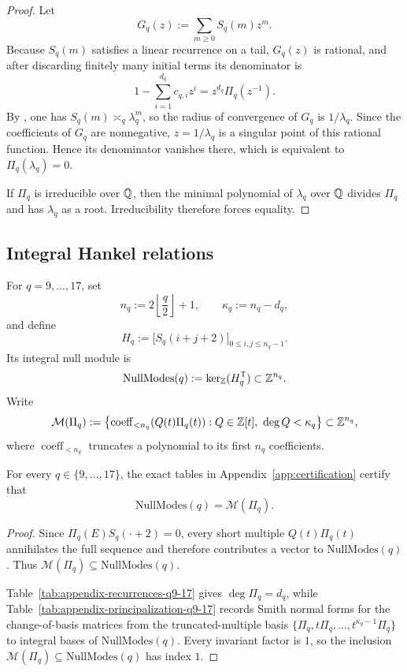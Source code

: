 \begin{proof}
Let
\[
  G_q(z):=\sum_{m\ge 0} S_q(m)z^m.
\]
Because \(S_q(m)\) satisfies a linear recurrence on a tail, \(G_q(z)\) is
rational, and after discarding finitely many initial terms its denominator is
\[
  1-\sum_{i=1}^{d_q} c_{q,i} z^i
  =
  z^{d_q}\Pi_q(z^{-1}).
\]
By , one has \(S_q(m)\asymp_q \lambda_q^m\), so the
radius of convergence of \(G_q\) is \(1/\lambda_q\).  Since the coefficients of
\(G_q\) are nonnegative, \(z=1/\lambda_q\) is a singular point of this rational
function.  Hence its denominator vanishes there, which is equivalent to
\(\Pi_q(\lambda_q)=0\).

If \(\Pi_q\) is irreducible over \(\mathbb{Q}\), then the minimal polynomial of
\(\lambda_q\) over \(\mathbb{Q}\) divides \(\Pi_q\) and has \(\lambda_q\) as a root.
Irreducibility therefore forces equality.
\end{proof}

\subsection{Integral Hankel relations}

\begin{definition}
\label{def:hankel-null-modes}
For \(q=9,\dots,17\), set
\[
  n_q:=2\left\lfloor\frac{q}{2}\right\rfloor+1,
  \qquad
  \kappa_q:=n_q-d_q,
\]
and define
\[
  H_q:=\bigl[S_q(i+j+2)\bigr]_{0\le i,j\le n_q-1}.
\]
Its integral null module is
\[
  \mathrm{NullModes}(q):=\ker_{\mathbb{Z}}(H_q^{\mathsf T})\subset \mathbb{Z}^{n_q}.
\]
Write
\[
  \mathcal M(\Pi_q):=
  \bigl\{\operatorname{coeff}_{<n_q}(Q(t)\Pi_q(t)):
  Q\in\mathbb{Z}[t],\ \deg Q<\kappa_q\bigr\}\subset\mathbb{Z}^{n_q},
\]
where \(\operatorname{coeff}_{<n_q}\) truncates a polynomial to its first
\(n_q\) coefficients.
\end{definition}

\begin{observation}
\label{obs:principalization-window}
For every \(q\in\{9,\dots,17\}\), the exact tables in
Appendix~\ref{app:certification} certify that
\[
  \mathrm{NullModes}(q)=\mathcal M(\Pi_q).
\]
\end{observation}

\begin{proof}
Since \(\Pi_q(E)S_q(\cdot+2)=0\), every short multiple \(Q(t)\Pi_q(t)\)
annihilates the full sequence and therefore contributes a vector to
\(\mathrm{NullModes}(q)\).  Thus
\(\mathcal M(\Pi_q)\subseteq \mathrm{NullModes}(q)\).

Table~\ref{tab:appendix-recurrences-q9-17} gives \(\deg \Pi_q=d_q\), while
Table~\ref{tab:appendix-principalization-q9-17} records Smith normal forms for
the change-of-basis matrices from the truncated-multiple basis
\(\{\Pi_q,t\Pi_q,\dots,t^{\kappa_q-1}\Pi_q\}\) to integral bases of
\(\mathrm{NullModes}(q)\).  Every invariant factor is \(1\), so the inclusion
\(\mathcal M(\Pi_q)\subseteq \mathrm{NullModes}(q)\) has index \(1\).
\end{proof}

